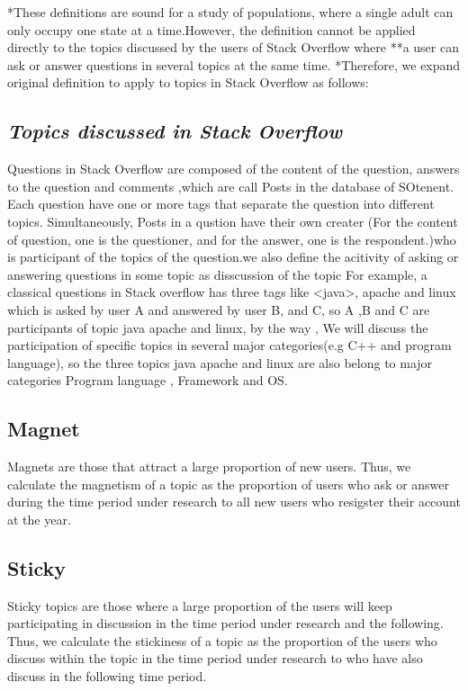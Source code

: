 \documentclass[conference]{IEEEtran}
\begin{document}
*These definitions are sound for a study of populations, where a single adult can only occupy one state at a time.However, the definition cannot be applied directly to the topics discussed by the users of Stack Overflow where **a user can ask or answer questions in several topics at the same time. *Therefore, we expand original definition to apply to topics in Stack Overflow as follows:

\medskip
\subsection*{\textit{\textbf{Topics discussed in Stack Overflow}}}

Questions in Stack Overflow are composed of the content of the question, answers to the question and comments ,which are call Posts in the database of SOtenent. Each question have one or more tags that separate the question into different topics. Simultaneously, Posts in a qustion have their own creater (For the content of question, one is the questioner, and for the answer, one is the respondent.)who is participant of the topics of the question.we also define the acitivity of asking or answering questions in some topic as disscussion of the topic For example, a classical questions in Stack overflow has three tags like <java>, apache and linux which is asked by user A and answered by user B, and C, so A ,B and C are participants of topic java apache and linux, by the way , We will discuss the participation of specific topics in several major categories(e.g C++ and program language), so the three topics java apache and linux are also belong to major categories Program language , Framework and OS.

\subsection*{Magnet}
Magnets are those that attract a large proportion of new users. Thus, we calculate the magnetism of a topic as the proportion of users who ask or answer during the time period under research to all new users who resigster their account at the year.

\subsection*{Sticky}
Sticky topics are those where a large proportion of the users will keep participating in discussion in the time period under research and the following. Thus, we calculate the stickiness of a topic as the proportion of the users who discuss within the topic in the time period under research to who have also discuss in the following time period.
\end{document}
